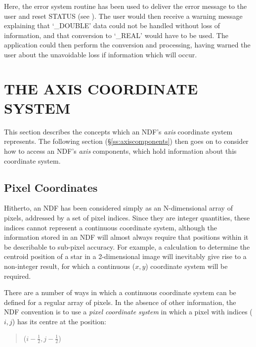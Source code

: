 \documentclass[twoside,11pt,nolof]{starlink}
\providecommand{\st}[1]{{\emph{#1}}}
\begin{document}
Here, the error system routine 
has been used to deliver the error message to the user and reset
STATUS (see ).
The user would then receive a warning message explaining that `\_DOUBLE'
data could not be handled without loss of information, and that conversion
to `\_REAL' would have to be used.
The application could then perform the conversion and processing, having
warned the user about the unavoidable loss if information which will occur.


\section{\label{ss:axiscoordinates}THE AXIS COORDINATE SYSTEM}

This section describes the concepts which an NDF's \st{axis\/} coordinate
system represents.
The following section (\S\ref{ss:axiscomponents}) then goes on to consider
how to access an NDF's \st{axis\/} components, which hold information about
this coordinate system.

\subsection{\label{ss:pixelcoordinates}Pixel Coordinates}

Hitherto, an NDF has been considered simply as an N-dimensional array of
pixels, addressed by a set of pixel indices.
Since they are integer quantities, these indices cannot represent a
continuous coordinate system, although the information stored in an NDF will
almost always require that positions within it be describable to sub-pixel
accuracy.
For example, a calculation to determine the centroid position of a star in a
2-dimensional image will inevitably give rise to a non-integer result, for
which a continuous ($x,y$) coordinate system will be required.

There are a number of ways in which a continuous coordinate system can be
defined for a regular array of pixels.
In the absence of other information, the NDF convention is to use a
\st{pixel coordinate system\/} in which a pixel with indices ($i,j$)
has
its centre at the position:

\small
\begin{quote}
\begin{center}
($i-\frac{1}{2},j-\frac{1}{2}$)
\end{center}
\end{quote}
\normalsize
\end{document}

